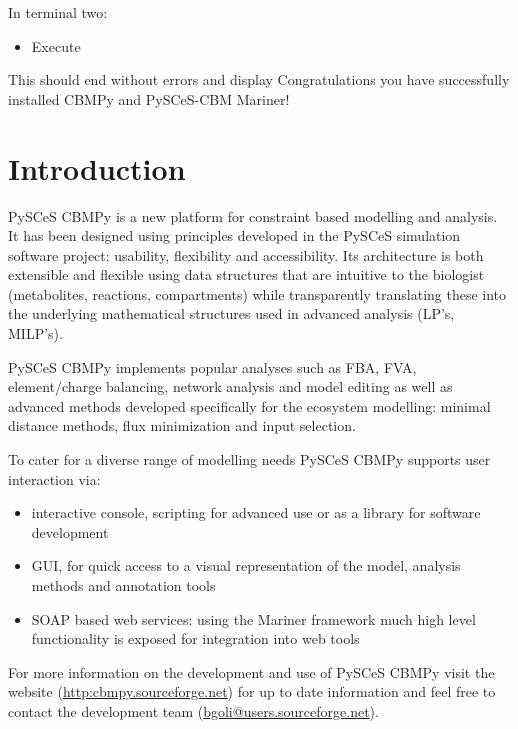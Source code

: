 \documentclass[a4paper,11pt,english]{sphinxmanual}
\begin{document}
In terminal two:
\begin{itemize}
\item {} 
Execute 

\end{itemize}

This should end without errors and display  Congratulations
you have successfully installed CBMPy and PySCeS-CBM Mariner!


\chapter{Introduction}
\label{manual_doc:introduction}\label{manual_doc:introducing-cbmpy}\label{manual_doc::doc}
PySCeS CBMPy is a new platform for constraint based modelling and analysis. It has been designed using principles
developed in the PySCeS simulation software project: usability, flexibility and accessibility. Its architecture
is both extensible and flexible using data structures that are intuitive to the biologist (metabolites, reactions, compartments)
while transparently translating these into the underlying mathematical structures used in advanced analysis (LP's, MILP's).

PySCeS CBMPy implements popular analyses such as FBA, FVA, element/charge balancing, network analysis and model editing as
well as advanced methods developed specifically for the ecosystem modelling: minimal distance methods, flux minimization and input selection.

To cater for a diverse range of modelling needs PySCeS CBMPy supports user interaction via:
\begin{itemize}
\item {} 
interactive console, scripting for advanced use or as a library for software development

\item {} 
GUI, for quick access to a visual representation of the model, analysis methods and annotation tools

\item {} 
SOAP based web services: using the Mariner framework much high level functionality is exposed for integration into web tools

\end{itemize}

For more information on the development and use of PySCeS CBMPy visit the website (\url{http:cbmpy.sourceforge.net}) for up to date information and
feel free to contact the development team (\href{mailto:bgoli@users.sourceforge.net}{bgoli@users.sourceforge.net}).
\end{document}
